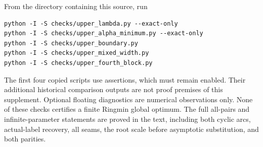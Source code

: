 \documentclass[11pt,letterpaper]{article}
\begin{document}
From the directory containing this source, run
\begin{verbatim}
python -I -S checks/upper_lambda.py --exact-only
python -I -S checks/upper_alpha_minimum.py --exact-only
python -I -S checks/upper_boundary.py
python -I -S checks/upper_mixed_width.py
python -I -S checks/upper_fourth_block.py
\end{verbatim}
The first four copied scripts use assertions, which must remain enabled.
Their additional historical comparison outputs are not proof premises
of this supplement. Optional floating diagnostics are numerical
observations only. None of these checks certifies a finite Ringmin global
optimum. The full all-pairs and infinite-parameter statements are proved
in the text, including both cyclic arcs, actual-label recovery, all seams,
the root scale before asymptotic substitution, and both parities.
\end{document}

